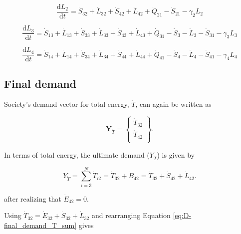 \documentclass[authoryear,preprint,review,12pt]{elsarticle}
\renewcommand{\vec}[1]{\mathbf{#1}}
\begin{document}
\begin{equation} \label{eq:D-embodied_acct_2_depreciation}
	\frac{\mathrm{d}L_{2}}{\mathrm{d}t} 	 = \dot{S}_{32} + \dot{L}_{32} + \dot{S}_{42} + \dot{L}_{42} + \dot{Q}_{21} - \dot{S}_{21} - \gamma_2 L_2
\end{equation}

\begin{equation} \label{eq:D-embodied_acct_3_depreciation}
	\frac{\mathrm{d}L_{3}}{\mathrm{d}t} 	 = \dot{S}_{13} + \dot{L}_{13} + \dot{S}_{33} + \dot{L}_{33} + \dot{S}_{43} + \dot{L}_{43} + \dot{Q}_{31} - \dot{S}_{3} - \dot{L}_{3} - \dot{S}_{31} - \gamma_3 L_3
\end{equation}

\begin{equation} \label{eq:D-embodied_acct_4_depreciation}
	\frac{\mathrm{d}L_{4}}{\mathrm{d}t}	 = \dot{S}_{14} + \dot{L}_{14} + \dot{S}_{34} + \dot{L}_{34} + \dot{S}_{44} + \dot{L}_{44} + \dot{Q}_{41} - \dot{S}_{4} - \dot{L}_{4} - \dot{S}_{41} - \gamma_4 L_4
\end{equation}


\subsection{Final demand}

Society's demand vector for total energy, $\dot{T}$, can again be written as 

\begin{equation} \label{eq:D-demand_vector_T_dot}
	\vec{Y}_{\dot{T}} = 	\begin{Bmatrix} 	\dot{T}_{32}	\\
																\dot{T}_{42}	\\
									\end{Bmatrix}.
\end{equation}

\noindent In terms of total energy, the ultimate demand ($Y_{\dot{T}}$) is given by 

\begin{equation} \label{eq:D-final_demand_T_sum}
	Y_{\dot{T}} = 	\sum_{i=3}^{N} \dot{T}_{i2} = \dot{T}_{32} + \dot{B}_{42} = \dot{T}_{32} + \dot{S}_{42} + \dot{L}_{42}.
\end{equation}

\noindent after realizing that $\dot{E}_{42} = 0$.

Using $\dot{T}_{32} = \dot{E}_{32} + \dot{S}_{32} + \dot{L}_{32}$ and rearranging Equation \ref{eq:D-final_demand_T_sum} gives
\end{document}
